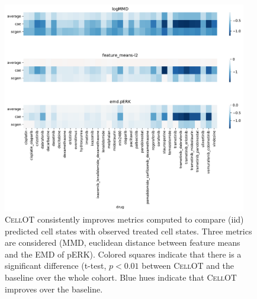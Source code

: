\begin{figure}[h]
  \begin{center}
    \includegraphics[width=0.95\textwidth]{figures/cellot-cohort/supplement/iid-metrics-drugs.pdf}
  \end{center}
  \caption{\textsc{CellOT} consistently improves metrics computed to compare (iid) predicted cell states with observed treated cell states.
  Three metrics are considered (MMD, euclidean distance between feature means and the EMD of pERK). 
  Colored squares indicate that there is a significant difference (t-test, $p < 0.01$ between \textsc{CellOT} and the baseline over the whole cohort.
  Blue hues indicate that \textsc{CellOT} improves over the baseline.
  }\label{fig:cellot-cohort-iid-metrics}
\end{figure}

